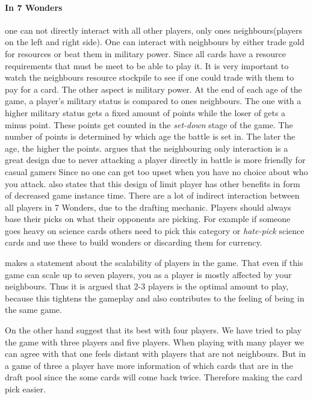 \documentclass[a4paper]{article}
\begin{document}
\paragraph{In 7 Wonders} one can not directly interact with all other players, only ones neighbours(players on the left and right side).
One can interact with neighbours by either trade gold for resources or beat them in military power.
Since all cards have a resource requirements that must be meet to be able to play it.
It is very important to watch the neighbours resource stockpile to see if one could trade with them to pay for a card.
The other aspect is military power.
At the end of each age of the game, a player's military status is compared to ones neighbours.
The one with a higher military status gets a fixed amount of points while the loser of gets a minus point.
These points get counted in the \textit{set-down} stage of the game. The number of points is determined by which age the battle is set in.
The later the age, the higher the points. 
 argues that the neighbouring only interaction is a great design due to never attacking a player directly in battle is more friendly for casual gamers Since no one can get too upset when you have no choice about who you attack. \citeauthor{notsacgame7wond} also states that this design of limit player has other benefits in form of decreased game instance time.
There are a lot of indirect interaction between all players in 7 Wonders, due to the drafting mechanic. Players should always base their picks on what their opponents are picking.
For example if someone goes heavy on science cards others need to pick this category or \textit{hate-pick} science cards and use these to build wonders or discarding them for currency.

 makes a statement about the scalability of players in the game.
That even if this game can scale up to seven players, you as a player is mostly affected by your neighbours.
Thus it is argued that 2-3 players is the optimal amount to play, because this tightens the gameplay and also contributes to the feeling of being in the same game.

On the other hand  suggest that its best with four players.
We have tried to play the game with three players and five players.
When playing with many player we can agree with \citeauthor{critical7wond} that one feels distant with players that are not neighbours.
But in a game of three a player have more information of which cards that are in the draft pool since the some cards will come back twice. Therefore making the card pick easier. 
\end{document}

